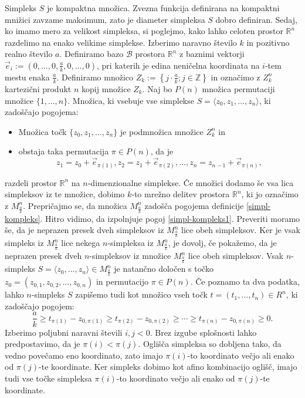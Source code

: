 \documentclass[mat1]{fmfdelo}
\newcommand{\R}{\mathbb R}
\newcommand{\Z}{\mathbb Z}
\newcommand{\0}{0}
\newcommand{\pB}{\mathcal B}
\begin{document}
Simpleks $S$ je kompaktna množica. Zvezna funkcija definirana na kompaktni mnižici zavzame maksimum, zato je diameter simpleksa $S$ dobro definiran.
Sedaj, ko imamo mero za velikost simpleksa, si poglejmo, kako lahko celoten prostor $\R^n$ razdelimo na enako velikime simplekse. Izberimo naravno število $k$ in pozitivno realno število $a$. Definiramo bazo $\pB$ prostora $\R^n$ z baznimi vektorji $\vec{e}_i := (0, \dots, 0, \frac{a}{k}, 0, \dots, 0)$, pri katerih je edina neničelna koordinata na $i$-tem mestu enaka $\frac{a}{k}$. Definiramo množico $Z_k := \left\{ j \cdot \frac{a}{k}; j \in \Z \right\}$ in označimo z $Z_k^n$ kartezični produkt $n$ kopij množice $Z_k$. Naj bo $P(n)$ množica permutaciji množice $\{1, \dots, n \}$.
Množica, ki vsebuje vse simplekse $S = \langle z_0, z_1, \dots, z_n \rangle$, ki zadoščajo pogojema:
\begin{itemize}
\item Množica točk $\{ z_0, z_1, \dots, z_n \}$ je podmnožica množice $Z_k^n$ in
\item obstaja taka permutacija $\pi \in P(n)$, da je 
\begin{equation*}
z_1 = z_0 + \vec{e}_{\pi(1)}, z_2 = z_1 + \vec{e}_{\pi(2)}, \dots, z_n = z_{n-1} + \vec{e}_{\pi(n)},
\end{equation*}
\end{itemize}
razdeli prostor $\R^n$ na $n$-dimenzionalne simplekse.
Če množici dodamo še vsa lica simpleksov iz te množice, dobimo $k$-to mrežno delitev prostora $\R^n$, ki jo označimo z $M_{\frac{a}{k}}^n$.
Prepričajmo se, da množica $M_{\frac{a}{k}}^n$ zadošča pogojema definicije \ref{simpl-kompleks}. Hitro vidimo, da izpolnjuje pogoj \eqref{simpl-kompleks1}. Preveriti moramo še, da je neprazen presek dveh simpleksov iz $M_{\frac{a}{k}}^n$ lice obeh simpleksov. Ker je vsak simpleks iz $M_{\frac{a}{k}}^n$ lice nekega $n$-simpleksa iz $M_{\frac{a}{k}}^n$, je dovolj, če pokažemo, da je neprazen presek dveh $n$-simpleksov iz množice $M_{\frac{a}{k}}^n$ lice obeh simpleksov. Vsak $n$-simpleks $S = \langle z_0, \dots, z_n \rangle \in  M_{\frac{a}{k}}^n$ je natančno določen s točko $z_0 = (z_{0,1}, z_{0, 2}, \dots, z_{0,n})$ in permutacijo $\pi \in P(n)$. Če poznamo ta dva podatka, lahko $n$-simpleks $S$ zapišemo tudi kot množico vseh točk $t=(t_1, \dots, t_n) \in R^n$, ki zadoščajo pogojem:
$$\frac{a}{k} \geq t_{\pi(1)} - z_{0, \pi(1)}  \geq t_{\pi(2)} - z_{0, \pi(2)} \geq \cdots \geq t_{\pi(n)} - z_{0, \pi(n)} \geq 0.$$
Izberimo poljubni naravni števili $i, j < 0$. Brez izgube splošnosti lahko predpostavimo, da je $\pi(i) < \pi(j)$. Oglišča simpleksa so dobljena tako, da vedno povečamo eno koordinato, zato imajo $\pi(i)$-to koordinato večjo ali enako od $\pi(j)$-te koordinate. Ker simpleks dobimo kot afino kombinacijo oglišč, imajo tudi vse točke simpleksa $\pi(i)$-to koordinato večjo ali enako od $\pi(j)$-te koordinate.
\end{document}
